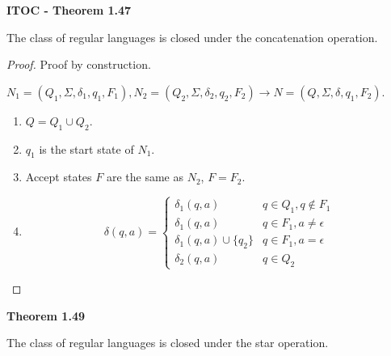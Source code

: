 \begin{shaded}
\textbf{ITOC - Theorem 1.47}

\medskip
The class of regular languages is closed under the concatenation operation.
\end{shaded}

\begin{mdframed}
\begin{proof}
Proof by construction.

$N_1 = (Q_1, \Sigma, \delta_1, q_1, F_1 ), N_2 = (Q_2, \Sigma, \delta_2, q_2, F_2) \rightarrow N = (Q, \Sigma, \delta, q_1, F_2)$.

\begin{enumerate}
\item $Q = Q_1 \cup Q_2$.
\item $q_1$ is the start state of $N_1$.
\item Accept states $F$ are the same as $N_2$, $F=F_2$.
\item 
\[
\delta(q, a) = \begin{cases}
\delta_1(q, a) 	&q \in Q_1, q \not \in F_1\\
\delta_1(q, a) 	&q \in F_1, a \neq \epsilon \\
\delta_1(q, a) \cup \{q_2\}	&q \in F_1, a = \epsilon \\
\delta_2(q, a)    & q \in Q_2
\end{cases}
\]
\end{enumerate}
\end{proof}
\end{mdframed}

\begin{shaded}
\textbf{Theorem 1.49}

\medskip
The class of regular languages is closed under the star operation.
\end{shaded}

